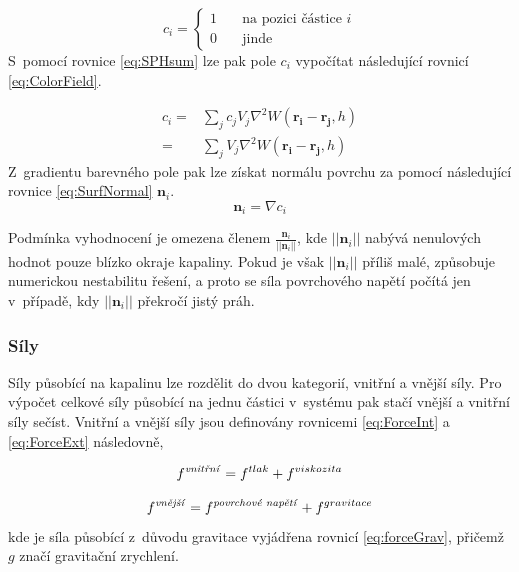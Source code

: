 \begin{equation}
	c_i =
	\begin{cases}
		1 & \quad  \text{na pozici částice } i \\
		0 & \quad  \text{jinde}
	\end{cases}
	\label{eq:color}
\end{equation}
S~pomocí rovnice \ref{eq:SPHsum} lze pak pole $c_i$ vypočítat následující rovnicí \ref{eq:ColorField}.

\begin{equation}
	\begin{split}
		c_i =   & \sum_j c_j V_j \nabla^2 W(\mathbf{r_i} - \mathbf{r_j},h) \\
		=   & \sum_j V_j \nabla^2 W(\mathbf{r_i} - \mathbf{r_j},h)
	\end{split}
	\label{eq:ColorField}
\end{equation}
Z~gradientu barevného pole pak lze získat normálu povrchu za pomocí následující rovnice \ref{eq:SurfNormal} $\mathbf{n}_i$.
\begin{equation}
	\mathbf{n}_i = \nabla c_i
	\label{eq:SurfNormal}
\end{equation}

Podmínka vyhodnocení je omezena členem $\frac{\mathbf{n}_i}{||\mathbf{n}_i||}$, kde $||\mathbf{n}_i||$ nabývá nenulových hodnot pouze blízko okraje kapaliny. Pokud je však $||\mathbf{n}_i||$ příliš malé, způsobuje numerickou nestabilitu řešení, a proto se síla povrchového napětí počítá jen v~případě, kdy $||\mathbf{n}_i||$ překročí jistý práh.


\subsubsection{Síly}
Síly působící na kapalinu lze rozdělit do dvou kategorií, vnitřní a vnější síly. Pro výpočet celkové síly působící na jednu částici v~systému pak stačí vnější a vnitřní síly sečíst. Vnitřní a vnější síly jsou definovány rovnicemi \ref{eq:ForceInt} a \ref{eq:ForceExt} následovně, \cite{KelagerSPH}

\begin{equation}
	f^{\text{\textit{vnitřní}}} = f^{tlak} + f^{viskozita}
	\label{eq:ForceInt}
\end{equation}

\begin{equation}
	f^{\text{\textit{vnější}}} = f^{\text{\textit{povrchové napětí}}} + f^{gravitace}
	\label{eq:ForceExt}
\end{equation}
kde je síla působící z~důvodu gravitace vyjádřena rovnicí \ref{eq:forceGrav}, přičemž $g$ značí gravitační zrychlení.

